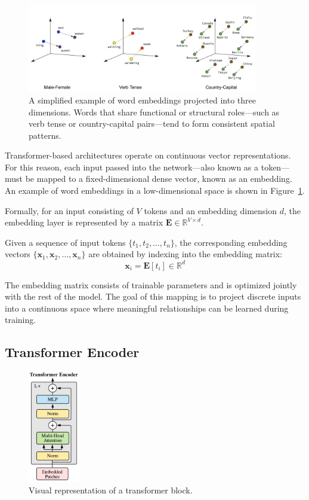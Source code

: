 \documentclass{pracalicmgr}
\begin{document}
\begin{figure}[h]
    \centering
    \includegraphics[width=0.9\textwidth]{src/word_embeddings_semantics.png}
    \caption{A simplified example of word embeddings projected into three dimensions. Words that share functional or structural roles—such as verb tense or country-capital pairs—tend to form consistent spatial patterns.}
    \label{fig:embedding_example}
\end{figure}

Transformer-based architectures operate on continuous vector representations. For this reason, each input passed into the network—also known as a token—must be mapped to a fixed-dimensional dense vector, known as an embedding. An example of word embeddings in a low-dimensional space is shown in Figure~\ref{fig:embedding_example}.

Formally, for an input consisting of \( V \) tokens and an embedding dimension \( d \), the embedding layer is represented by a matrix \( \mathbf{E} \in \mathbb{R}^{V \times d} \).

Given a sequence of input tokens \( \{t_1, t_2, \ldots, t_n\} \), the corresponding embedding vectors \( \{\mathbf{x}_1, \mathbf{x}_2, \ldots, \mathbf{x}_n\} \) are obtained by indexing into the embedding matrix:
\[
\mathbf{x}_i = \mathbf{E}[t_i] \in \mathbb{R}^d
\]

The embedding matrix consists of trainable parameters and is optimized jointly with the rest of the model. The goal of this mapping is to project discrete inputs into a continuous space where meaningful relationships can be learned during training.

\subsection{Transformer Encoder}

\begin{figure}[h]
    \centering
    \includegraphics[width=0.2\textwidth]{src/transformerEncoder.pdf}
    \caption{Visual representation of a transformer block.}
    \label{fig:transformerEncoder}
\end{figure}
\end{document}

